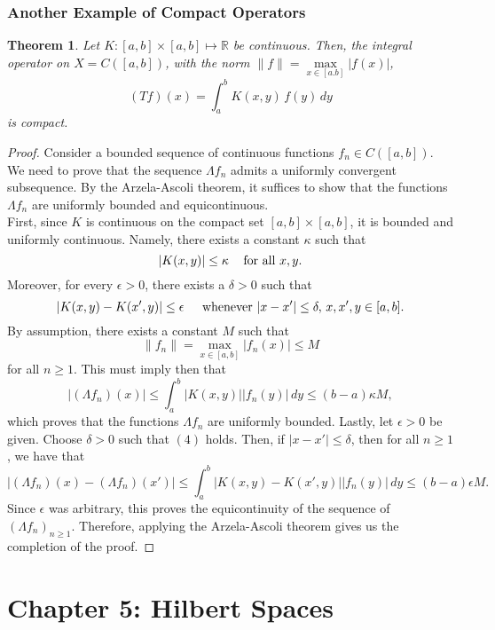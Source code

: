 \documentclass[12pt]{article}
\newtheorem{theorem}{Theorem}
\newcommand{\R}{{\mathbb R}}
\newcommand{\dint}{\displaystyle\int}
\begin{document}
\subsubsection*{Another Example of Compact Operators}
\begin{theorem}
Let $K: [a, b] \times [a, b] \mapsto \R$ be continuous. Then, the integral operator on $X = C([a,b])$, with the norm $\| f \| = \max\limits_{x \in [a.b]} |f(x)|$, 
\[ (Tf)(x) = \dint_a^b K(x, y) \, f(y) \, dy\]
is compact. 
\end{theorem}
\vspace{-25pt}
\begin{proof}
Consider a bounded sequence of continuous functions $f_n \in C([a, b])$. We need to prove that the sequence $\Lambda f_n$ admits a uniformly convergent subsequence. By the Arzela-Ascoli theorem, it suffices to show that the functions $\Lambda f_n$ are uniformly bounded and equicontinuous. \\
\indent First, since $K$ is continuous on the compact set $[a, b] \times [a, b]$, it is bounded and uniformly continuous. Namely, there exists a constant $\kappa$ such that 
\[ |K(x, y)| \leq \kappa \hspace{3mm} \text{ for all } x, y.\]
Moreover, for every $\epsilon > 0$, there exists a $\delta > 0$ such that 
\begin{equation}
|K(x, y) - K(x', y)| \leq \epsilon \hspace{4mm} \text{ whenever } |x - x'| \leq \delta, \, x, x', y \in [a, b].
\end{equation}
By assumption, there exists a constant $M$ such that 
\[ \| f_n \| = \max\limits_{x \in [a,b]} |f_n(x) | \leq M\]
for all $n \geq 1$. This must imply then that 
\[ \left| \left( \Lambda f_n \right)(x) \right| \leq \dint_a^b |K(x, y)| |f_n(y)|\, dy \leq (b-a) \kappa M,\]
which proves that the functions $\Lambda f_n$ are uniformly bounded. Lastly, let $\epsilon > 0$ be given. Choose $\delta > 0$ such that $(4)$ holds. Then, if $|x - x'| \leq \delta$, then for all $n \geq 1$, we have that 
\[ \left| \left( \Lambda f_n \right)(x) - \left( \Lambda f_n \right)(x') \right| \leq \dint_a^b |K(x, y) - K(x', y)| |f_n(y)| \, dy \leq (b-a) \epsilon M.\]
Since $\epsilon$ was arbitrary, this proves the equicontinuity of the sequence of $(\Lambda f_n)_{n \geq 1}$. Therefore, applying the Arzela-Ascoli theorem gives us the completion of the proof. 
\end{proof}
\section*{Chapter 5: Hilbert Spaces}
 \setcounter{theorem}{0}
 \setcounter{proposition}{0}
  \setcounter{definition}{0}
 \setcounter{corollary}{0}
 \setcounter{cons}{0}
 \setcounter{equation}{0}
 \setcounter{lemma}{0}
\end{document}
